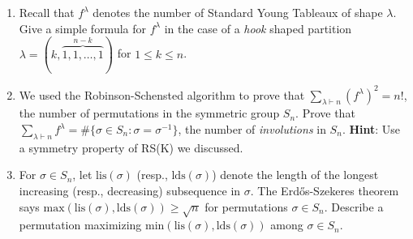 \documentclass[11pt]{article}
\begin{document}
\begin{enumerate}
\item Recall that $f^{\lambda}$ denotes the number of Standard Young Tableaux of shape $\lambda$. Give a simple formula for $f^{\lambda}$ in the case of a \emph{hook} shaped partition $\lambda = (k,\overbrace{1,1,\ldots,1}^{n-k})$ for $1\leq k \leq n$. 

\item We used the Robinson-Schensted algorithm to prove that $\sum_{\lambda \vdash n} (f^{\lambda})^2 = n!$, the number of permutations in the symmetric group $S_n$. Prove that $\sum_{\lambda \vdash n} f^{\lambda} = \#\{\sigma \in S_n \colon \sigma=\sigma^{-1}\}$, the number of \emph{involutions} in $S_n$. {\bf Hint}: Use a symmetry property of RS(K) we discussed.

\item For $\sigma\in S_n$, let $\mathrm{lis}(\sigma)$ (resp., $\mathrm{lds}(\sigma)$) denote the length of the longest increasing (resp., decreasing) subsequence in $\sigma$. The Erd\H{o}s-Szekeres theorem says $\mathrm{max}(\mathrm{lis}(\sigma), \mathrm{lds}(\sigma)) \geq \sqrt{n}$ for permutations $\sigma\in S_n$. Describe a permutation maximizing $\mathrm{min}(\mathrm{lis}(\sigma), \mathrm{lds}(\sigma))$ among  $\sigma \in S_n$.

\end{enumerate}
\end{document}
